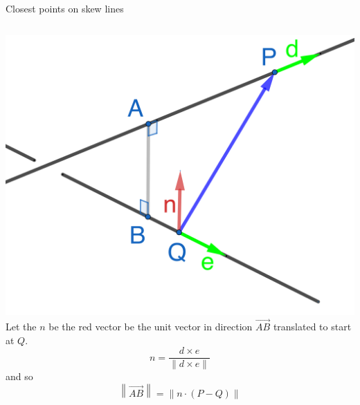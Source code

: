 \documentclass{beamer}
\begin{document}
\begin{frame}{Closest points on skew lines}
\begin{columns}
    \hspace{-1cm}
    \includegraphics[scale=0.3]{skew-distance2.png}
    Let the $n$ be the red vector be the unit vector in direction $\overrightarrow{AB}$ translated to start at $Q$.
    \begin{equation*}
    n =\frac{d\times e}{\|d\times e\|}
    \end{equation*}
    and so
    \begin{equation*}
    \left\|\overrightarrow{AB}\right\| = \|n\cdot (P-Q)\|
    \end{equation*}
\end{columns}
\end{frame}
\end{document}
